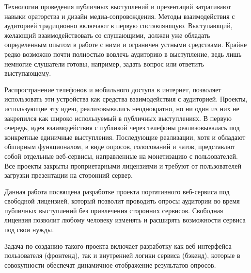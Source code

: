 







\Intro
Технологии проведения публичных выступлений и презентаций затрагивают навыки ораторства и дизайн медиа-сопровождения. Методы взаимодействия с аудиторией традиционно включают в первую составляющую. Выступающий, желающий взаимодействовать со слушающими, должен уже обладать определенным опытом в работе с ними и ограничен устными средствами. Крайне редко возможно почти полностью вовлечь аудиторию в выступление, ведь лишь немногие слушатели готовы, например, задать вопрос или ответить выступающему.


Распространение телефонов и мобильного доступа в интернет, позволяет использовать эти устройства как средства взаимодействия с аудиторией. Проекты, использующие эту идею, реализовывались неоднократно, но ни один из них не закрепился как широко используемый в публичных выступлениях. В первую очередь, идея взаимодействия с публикой через телефоны реализовывалась под конкретные единичные выступления. Последующие реализации, хотя и обладают обширным функционалом, в виде  опросов, голосований и чатов, представлют собой отдельные веб-сервисы, направленные на монетизацию с пользователей. Все проекты закрыты проприетарными лицензиями и требуют от пользователей загрузки презентации на сторонний сервер.

Данная работа посвящена разработке проекта портативного веб-сервиса под свободной лицензией, который позволит проводить опросы аудитории во время публичных выступлений без привлечения сторонних сервисов. Свободная лицензия позволит любому человеку изменять и расширять возможности сервиса под свои нужды.

Задача по созданию такого проекта включает разработку как веб-интерфейса пользователя (фронтенд), так и  внутренней логики сервиса (бэкенд), которые в совокупности обеспечат динамичное отображение результатов опросов.

